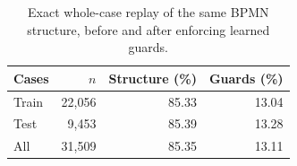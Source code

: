 \begin{table}[t]
\centering
\caption{Exact whole-case replay of the same BPMN structure, before and after enforcing learned guards.}
\label{tab:guarded-coverage}
\begin{tabular}{lrrr}
\hline
Cases & $n$ & Structure (\%) & Guards (\%) \\
\hline
Train & 22,056 & 85.33 & 13.04 \\
Test & 9,453 & 85.39 & 13.28 \\
All & 31,509 & 85.35 & 13.11 \\
\hline
\end{tabular}
\end{table}
